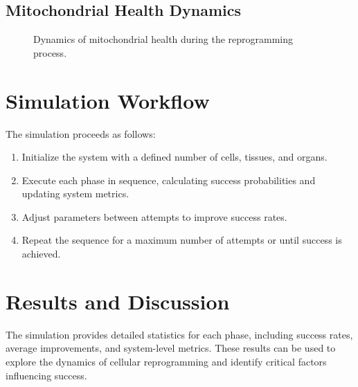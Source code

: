 \documentclass{article}
\begin{document}
\subsection{Mitochondrial Health Dynamics}
\begin{figure}[h]
\centering
{}
\caption{Dynamics of mitochondrial health during the reprogramming process.}
\label{fig:mitochondrial_health}
\end{figure}

\section{Simulation Workflow}
The simulation proceeds as follows:
\begin{enumerate}
    \item Initialize the system with a defined number of cells, tissues, and organs.
    \item Execute each phase in sequence, calculating success probabilities and updating system metrics.
    \item Adjust parameters between attempts to improve success rates.
    \item Repeat the sequence for a maximum number of attempts or until success is achieved.
\end{enumerate}

\section{Results and Discussion}
The simulation provides detailed statistics for each phase, including success rates, average improvements, and system-level metrics. These results can be used to explore the dynamics of cellular reprogramming and identify critical factors influencing success.
\end{document}
